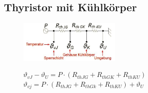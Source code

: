 \subsection{Thyristor mit Kühlkörper}
\begin{figure}[htbp]
  \begin{minipage}[t]{6cm}
    \vspace{0pt}
    \centering
    \includegraphics[width = 5cm]{./pictures/mitKuehlkoerper} 
  \end{minipage}
  \hfill
  \begin{minipage}[t]{6cm}
    \vspace{0pt}
    $\vartheta_{vJ} - \vartheta_{U} = P \cdot (R_{th JG}+ R_{th GK}+ R_{th KU})$\\
    $ \vartheta_{vj} = P \cdot (R_{th JG}+ R_{th Gk} +R_{th KU}) + \vartheta_{U}$\\\\\\
    
  \end{minipage}
\end{figure}
